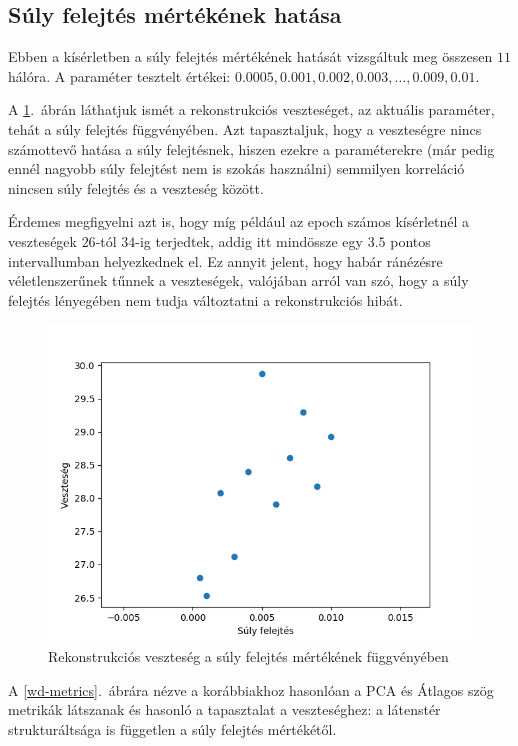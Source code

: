 \subsection{Súly felejtés mértékének hatása}

Ebben a kísérletben a súly felejtés mértékének hatását vizsgáltuk meg összesen $11$ hálóra. A paraméter tesztelt értékei: $0.0005, 0.001, 0.002, 0.003, \dots , 0.009, 0.01$.

A \ref{wd-loss}.~ábrán láthatjuk ismét a rekonstrukciós veszteséget, az aktuális paraméter, tehát a súly felejtés függvényében. Azt tapasztaljuk, hogy a veszteségre nincs számottevő hatása a súly felejtésnek, hiszen ezekre a paraméterekre (már pedig ennél nagyobb súly felejtést nem is szokás használni) semmilyen korreláció nincsen súly felejtés és a veszteség között. 

Érdemes megfigyelni azt is, hogy míg például az epoch számos kísérletnél a veszteségek $26$-tól $34$-ig terjedtek, addig itt mindössze egy $3.5$ pontos intervallumban helyezkednek el. Ez annyit jelent, hogy habár ránézésre véletlenszerűnek tűnnek a veszteségek, valójában arról van szó, hogy a súly felejtés lényegében nem tudja változtatni a rekonstrukciós hibát.



\begin{figure}[h!]
\begin{center}
  
  \includegraphics[width=0.75\linewidth]{metrics/vae_wd-loss.png}
  \caption{Rekonstrukciós veszteség a súly felejtés mértékének függvényében}\label{wd-loss}
\end{center}
\end{figure}

A \ref{wd-metrics}.~ábrára nézve a korábbiakhoz hasonlóan a PCA és Átlagos szög metrikák látszanak és hasonló a tapasztalat a veszteséghez: a látenstér strukturáltsága is független a súly felejtés mértékétől.

